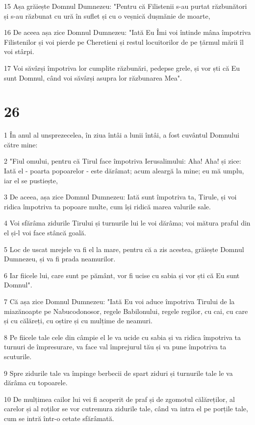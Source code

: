 \par 15 Așa grăiește Domnul Dumnezeu: "Pentru că Filistenii s-au purtat răzbunători și s-au răzbunat cu ură în suflet și cu o veșnică dușmănie de moarte,
\par 16 De aceea așa zice Domnul Dumnezeu: "Iată Eu Îmi voi întinde mâna împotriva Filistenilor și voi pierde pe Cheretieni și restul locuitorilor de pe țărmul mării îl voi stârpi.
\par 17 Voi săvârși împotriva lor cumplite răzbunări, pedepse grele, și vor ști că Eu sunt Domnul, când voi săvârși asupra lor răzbunarea Mea".

\chapter{26}

\par 1 În anul al unsprezecelea, în ziua întâi a lunii întâi, a fost cuvântul Domnului către mine:
\par 2 "Fiul omului, pentru că Tirul face împotriva Ierusalimului: Aha! Aha! și zice: Iată el - poarta popoarelor - este dărâmat; acum aleargă la mine; eu mă umplu, iar el se pustiește,
\par 3 De aceea, așa zice Domnul Dumnezeu: Iată sunt împotriva ta, Tirule, și voi ridica împotriva ta popoare multe, cum își ridică marea valurile sale.
\par 4 Voi sfărâma zidurile Tirului și turnurile lui le voi dărâma; voi mătura praful din el și-l voi face stâncă goală.
\par 5 Loc de uscat mrejele va fi el la mare, pentru că a zis acestea, grăiește Domnul Dumnezeu, și va fi prada neamurilor.
\par 6 Iar fiicele lui, care sunt pe pământ, vor fi ucise cu sabia și vor ști că Eu sunt Domnul".
\par 7 Că așa zice Domnul Dumnezeu: "Iată Eu voi aduce împotriva Tirului de la miazănoapte pe Nabucodonosor, regele Babilonului, regele regilor, cu cai, cu care și cu călăreți, cu oștire și cu mulțime de neamuri.
\par 8 Pe fiicele tale cele din câmpie el le va ucide cu sabia și va ridica împotriva ta turnuri de împresurare, va face val împrejurul tău și va pune împotriva ta scuturile.
\par 9 Spre zidurile tale va împinge berbecii de spart ziduri și turnurile tale le va dărâma cu topoarele.
\par 10 De mulțimea cailor lui vei fi acoperit de praf și de zgomotul călăreților, al carelor și al roților se vor cutremura zidurile tale, când va intra el pe porțile tale, cum se intră într-o cetate sfărâmată.

